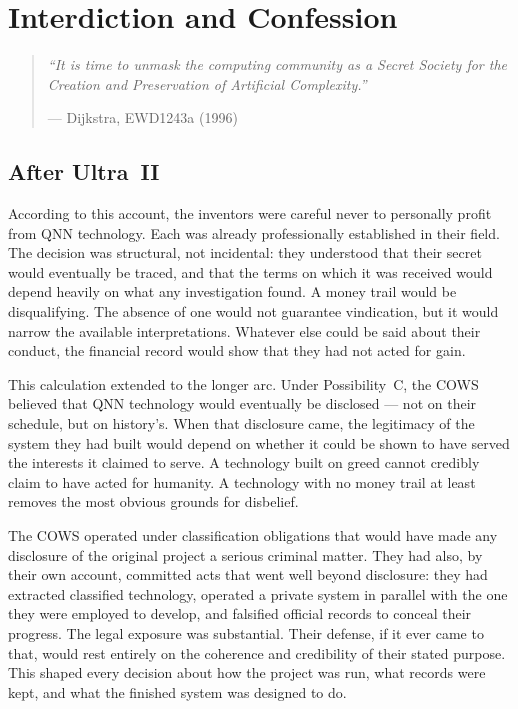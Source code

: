 
\chapter{Interdiction and Confession}
\label{pos26:interdiction}

\begin{quote}\small\textit{%
``It is time to unmask the computing community as a Secret Society for the Creation and Preservation of Artificial Complexity.''%
}\par\raggedleft --- Dijkstra, EWD1243a (1996)\end{quote}

\vspace{0.5cm}



\section*{After Ultra~II}
\label{pos26:after-ultra-ii}

According to this account, the inventors were careful never to personally profit from QNN technology. Each was already professionally established in their field. The decision was structural, not incidental: they understood that their secret would eventually be traced, and that the terms on which it was received would depend heavily on what any investigation found. A money trail would be disqualifying. The absence of one would not guarantee vindication, but it would narrow the available interpretations. Whatever else could be said about their conduct, the financial record would show that they had not acted for gain.

This calculation extended to the longer arc. Under Possibility~C, the COWS believed that QNN technology would eventually be disclosed --- not on their schedule, but on history's. When that disclosure came, the legitimacy of the system they had built would depend on whether it could be shown to have served the interests it claimed to serve. A technology built on greed cannot credibly claim to have acted for humanity. A technology with no money trail at least removes the most obvious grounds for disbelief.

The COWS operated under classification obligations that would have made any disclosure of the original project a serious criminal matter. They had also, by their own account, committed acts that went well beyond disclosure: they had extracted classified technology, operated a private system in parallel with the one they were employed to develop, and falsified official records to conceal their progress. The legal exposure was substantial. Their defense, if it ever came to that, would rest entirely on the coherence and credibility of their stated purpose. This shaped every decision about how the project was run, what records were kept, and what the finished system was designed to do.


